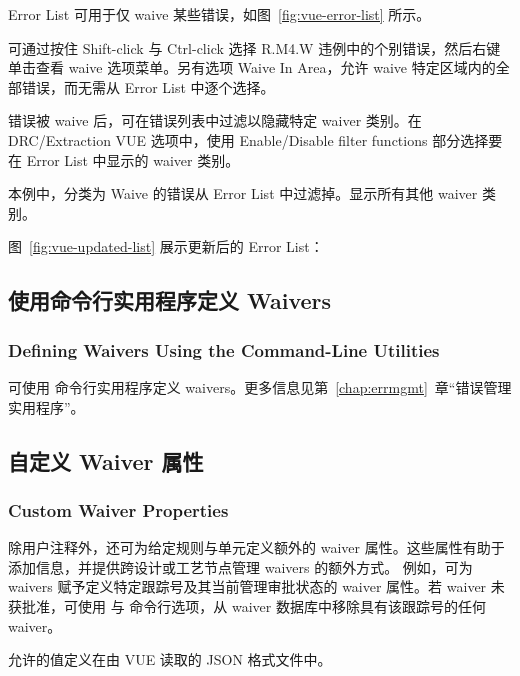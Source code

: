 Error List 可用于仅 waive 某些错误，如图~\ref{fig:vue-error-list} 所示。


可通过按住 Shift-click 与 Ctrl-click 选择 R.M4.W 违例中的个别错误，然后右键单击查看 waive 选项菜单。另有选项 Waive In Area，允许 waive 特定区域内的全部错误，而无需从 Error List 中逐个选择。

错误被 waive 后，可在错误列表中过滤以隐藏特定 waiver 类别。在 DRC/Extraction VUE 选项中，使用 Enable/Disable filter functions 部分选择要在 Error List 中显示的 waiver 类别。


本例中，分类为 Waive 的错误从 Error List 中过滤掉。显示所有其他 waiver 类别。

图~\ref{fig:vue-updated-list} 展示更新后的 Error List：


\subsection{使用命令行实用程序定义 Waivers}
\subsubsection*{Defining Waivers Using the Command-Line Utilities}

可使用  命令行实用程序定义 waivers。更多信息见第~\ref{chap:errmgmt}~章``错误管理实用程序''。

\subsection{自定义 Waiver 属性}
\subsubsection*{Custom Waiver Properties}

除用户注释外，还可为给定规则与单元定义额外的 waiver 属性。这些属性有助于添加信息，并提供跨设计或工艺节点管理 waivers 的额外方式。
例如，可为 waivers 赋予定义特定跟踪号及其当前管理审批状态的 waiver 属性。若 waiver 未获批准，可使用  与  命令行选项，从 waiver 数据库中移除具有该跟踪号的任何 waiver。

允许的值定义在由 VUE 读取的 JSON 格式文件中。

